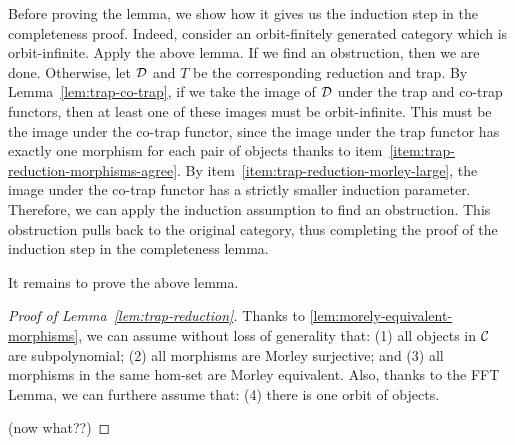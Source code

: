 Before proving the lemma, we show how it gives us the induction step in the completeness proof. Indeed, consider an orbit-finitely generated category which is orbit-infinite. Apply the above lemma. If we find an obstruction, then we are done. Otherwise, let ${\mathcal D}$ and $T$ be the corresponding reduction and trap. By Lemma~\ref{lem:trap-co-trap}, if we take the image of ${\mathcal D}$ under the trap and co-trap functors, then at least one of these images must be orbit-infinite. This must be the image under the co-trap functor, since the image under the trap functor has exactly one morphism for each pair of objects thanks to item~\ref{item:trap-reduction-morphisms-agree}. By item~\ref{item:trap-reduction-morley-large}, the image under the co-trap functor has a strictly smaller induction parameter. Therefore, we can apply the induction assumption to find an obstruction. This obstruction pulls back to the original category, thus completing the proof of the induction step in the completeness lemma. 

It remains to prove the above lemma. 

\begin{proof}[Proof of Lemma~\ref{lem:trap-reduction}]
    Thanks to \cref{lem:morely-equivalent-morphisms}, we can assume without loss of generality that: (1) all objects in ${\mathcal C}$ are subpolynomial; (2) all morphisms are Morley surjective; and (3) all morphisms in the same hom-set are Morley equivalent. Also, thanks to the FFT Lemma, we can furthere assume that: (4) there is one orbit of objects.

    (now what??)
\end{proof}


